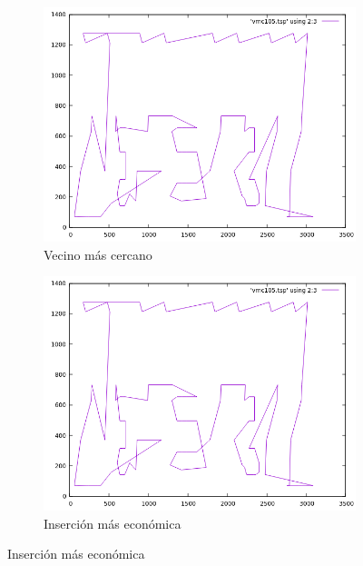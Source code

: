 \documentclass[12pt,spanish]{article}
\begin{document}
\begin{figure}[H]
\centering
\begin{subfigure}[b]{0.36\textwidth}
\includegraphics[width=\textwidth]{lin105_vmc.png}
\caption{Vecino más cercano}
\end{subfigure}
\quad
\begin{subfigure}[b]{0.36\textwidth}
\includegraphics[width=\textwidth]{lin105_vmc.png}
\caption{Inserción más económica}
\end{subfigure}

\vspace{1cm}


\end{figure}
\end{document}
